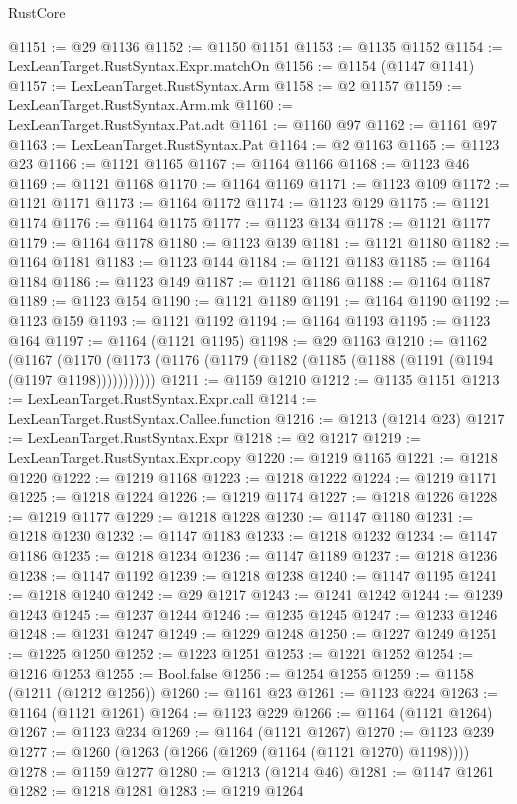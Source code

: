 \begin{lexlean}{RustCore}
\begin{coremodule}
@1151 := @29 @1136
@1152 := @1150 @1151
@1153 := @1135 @1152
@1154 := LexLeanTarget.RustSyntax.Expr.matchOn
@1156 := @1154 (@1147 @1141)
@1157 := LexLeanTarget.RustSyntax.Arm
@1158 := @2 @1157
@1159 := LexLeanTarget.RustSyntax.Arm.mk
@1160 := LexLeanTarget.RustSyntax.Pat.adt
@1161 := @1160 @97
@1162 := @1161 @97
@1163 := LexLeanTarget.RustSyntax.Pat
@1164 := @2 @1163
@1165 := @1123 @23
@1166 := @1121 @1165
@1167 := @1164 @1166
@1168 := @1123 @46
@1169 := @1121 @1168
@1170 := @1164 @1169
@1171 := @1123 @109
@1172 := @1121 @1171
@1173 := @1164 @1172
@1174 := @1123 @129
@1175 := @1121 @1174
@1176 := @1164 @1175
@1177 := @1123 @134
@1178 := @1121 @1177
@1179 := @1164 @1178
@1180 := @1123 @139
@1181 := @1121 @1180
@1182 := @1164 @1181
@1183 := @1123 @144
@1184 := @1121 @1183
@1185 := @1164 @1184
@1186 := @1123 @149
@1187 := @1121 @1186
@1188 := @1164 @1187
@1189 := @1123 @154
@1190 := @1121 @1189
@1191 := @1164 @1190
@1192 := @1123 @159
@1193 := @1121 @1192
@1194 := @1164 @1193
@1195 := @1123 @164
@1197 := @1164 (@1121 @1195)
@1198 := @29 @1163
@1210 := @1162
    (@1167 (@1170 (@1173 (@1176 (@1179 (@1182 (@1185 (@1188 (@1191 (@1194 (@1197 @1198)))))))))))
@1211 := @1159 @1210
@1212 := @1135 @1151
@1213 := LexLeanTarget.RustSyntax.Expr.call
@1214 := LexLeanTarget.RustSyntax.Callee.function
@1216 := @1213 (@1214 @23)
@1217 := LexLeanTarget.RustSyntax.Expr
@1218 := @2 @1217
@1219 := LexLeanTarget.RustSyntax.Expr.copy
@1220 := @1219 @1165
@1221 := @1218 @1220
@1222 := @1219 @1168
@1223 := @1218 @1222
@1224 := @1219 @1171
@1225 := @1218 @1224
@1226 := @1219 @1174
@1227 := @1218 @1226
@1228 := @1219 @1177
@1229 := @1218 @1228
@1230 := @1147 @1180
@1231 := @1218 @1230
@1232 := @1147 @1183
@1233 := @1218 @1232
@1234 := @1147 @1186
@1235 := @1218 @1234
@1236 := @1147 @1189
@1237 := @1218 @1236
@1238 := @1147 @1192
@1239 := @1218 @1238
@1240 := @1147 @1195
@1241 := @1218 @1240
@1242 := @29 @1217
@1243 := @1241 @1242
@1244 := @1239 @1243
@1245 := @1237 @1244
@1246 := @1235 @1245
@1247 := @1233 @1246
@1248 := @1231 @1247
@1249 := @1229 @1248
@1250 := @1227 @1249
@1251 := @1225 @1250
@1252 := @1223 @1251
@1253 := @1221 @1252
@1254 := @1216 @1253
@1255 := Bool.false
@1256 := @1254 @1255
@1259 := @1158 (@1211 (@1212 @1256))
@1260 := @1161 @23
@1261 := @1123 @224
@1263 := @1164 (@1121 @1261)
@1264 := @1123 @229
@1266 := @1164 (@1121 @1264)
@1267 := @1123 @234
@1269 := @1164 (@1121 @1267)
@1270 := @1123 @239
@1277 := @1260 (@1263 (@1266 (@1269 (@1164 (@1121 @1270) @1198))))
@1278 := @1159 @1277
@1280 := @1213 (@1214 @46)
@1281 := @1147 @1261
@1282 := @1218 @1281
@1283 := @1219 @1264

\end{coremodule}
\end{lexlean}
